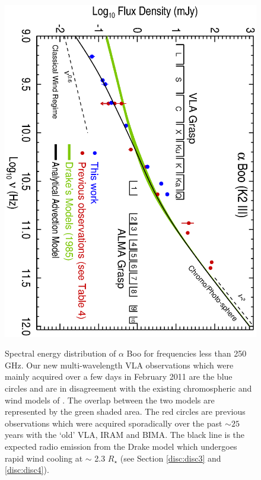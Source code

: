 \documentclass[iop]{emulateapj}
\begin{document}
\begin{figure}
\centering
\includegraphics[trim = 0mm 0mm 0mm 20mm, clip,scale=0.65, angle=90]{fig1.ps}
\\
\caption{Spectral energy distribution of $\alpha$ Boo for frequencies less than 250 GHz. Our new multi-wavelength VLA observations which were mainly acquired over a few days in February 2011 are the blue circles and are in disagreement with the existing chromospheric and wind models of \cite{1985pssl.proc..351D}. The overlap between the two models are represented by the green shaded area. The red circles are previous observations which were acquired sporadically over the past $\sim 25$ years with the `old' VLA, IRAM and BIMA. The black line is the expected radio emission from the Drake model which undergoes rapid wind cooling at $\sim$ 2.3 $R_{\star}$ (see Section \ref{disc:disc3} and \ref{disc:disc4}).}
\label{fig:fig1}
\centering

\end{figure}
\end{document}
